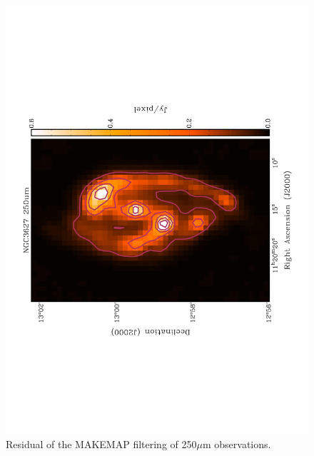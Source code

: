 \begin{figure}
  \centering
  \label{fig_250}
  \includegraphics[scale=0.5,angle=270]{obs_imgs/250_um.jpeg}
  \caption[NGC3627 250$\mu$m Observations]{Residual of the MAKEMAP filtering of 250$\mu$m observations.}
\end{figure}

